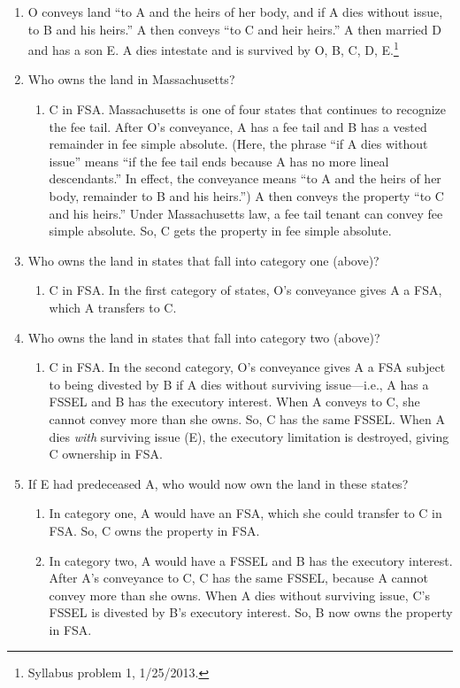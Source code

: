 \begin{enumerate}
    \item O conveys land ``to A and the heirs of her body, and if A dies 
    without issue, to B and his heirs.'' A then conveys ``to C and heir 
    heirs.'' A then married D and has a son E. A dies intestate and is 
    survived by O, B, C, D, E.\footnote{Syllabus problem 1, 1/25/2013.}
    \item Who owns the land in Massachusetts?
    \begin{enumerate}
        \item C in FSA. Massachusetts is one of four states that continues to 
        recognize the fee tail. After O's conveyance, A has a fee tail and B 
        has a vested remainder in fee simple absolute. (Here, the phrase ``if 
        A dies without issue'' means ``if the fee tail ends because A has no 
        more lineal descendants.'' In effect, the conveyance means ``to A and 
        the heirs of her body, remainder to B and his heirs.'') A then conveys 
        the property ``to C and his heirs.'' Under Massachusetts law, a fee 
        tail tenant can convey fee simple absolute. So, C gets the property 
        in fee simple absolute.
    \end{enumerate}
    \item Who owns the land in states that fall into category one (above)?
    \begin{enumerate}
        \item C in FSA. In the first category of states, O's conveyance gives 
        A a FSA, which A transfers to C.
    \end{enumerate}
    \item Who owns the land in states that fall into category two (above)?
    \begin{enumerate}
        \item C in FSA. In the second category, O's conveyance gives A a FSA subject 
        to being divested by B if A dies without surviving issue---i.e., A has 
        a FSSEL and B has the executory interest. When A conveys to C, she 
        cannot convey more than she owns. So, C has the same FSSEL. When A 
        dies \emph{with} surviving issue (E), the executory limitation is 
        destroyed, giving C ownership in FSA.
    \end{enumerate}
    \item If E had predeceased A, who would now own the land in these states?
    \begin{enumerate}
        \item In category one, A would have an FSA, which she could transfer 
        to C in FSA. So, C owns the property in FSA.
        \item In category two, A would have a FSSEL and B has the executory 
        interest. After A's conveyance to C, C has the same FSSEL, because A 
        cannot convey more than she owns. When A dies without surviving issue, 
        C's FSSEL is divested by B's executory interest. So, B now owns the 
        property in FSA.
    \end{enumerate}
\end{enumerate}

